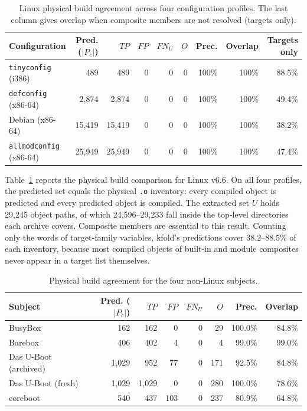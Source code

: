 \documentclass[acmsmall]{acmart}
\newcommand{\tool}{\textsf{kfold}\xspace}
\begin{document}
\begin{table}[t]
\centering\footnotesize
\caption{Linux physical build agreement across four configuration profiles.
The last column gives overlap when composite members are not resolved (targets only).}
\label{tab:linux-physical}
\begin{tabular}{lrrrrrrrr}
\toprule
Configuration & Pred. ($|P_c|$) & $TP$ & $FP$ & $FN_U$ & $O$ & Prec. & Overlap & Targets only \\
\midrule
\texttt{tinyconfig} (i386) & 489 & 489 & 0 & 0 & 0 & 100\% & 100\% & 88.5\% \\
\texttt{defconfig} (x86-64) & 2,874 & 2,874 & 0 & 0 & 0 & 100\% & 100\% & 49.4\% \\
Debian (x86-64) & 15,419 & 15,419 & 0 & 0 & 0 & 100\% & 100\% & 38.2\% \\
\texttt{allmodconfig} (x86-64) & 25,949 & 25,949 & 0 & 0 & 0 & 100\% & 100\% & 47.4\% \\
\bottomrule
\end{tabular}
\end{table}

Table~\ref{tab:linux-physical} reports the physical build comparison for Linux v6.6.
On all four profiles, the predicted set equals the physical \texttt{.o} inventory: every compiled object is predicted and every predicted object is compiled.
The extracted set $U$ holds 29,245 object paths, of which 24,596--29,233 fall inside the top-level directories each archive covers.
Composite members are essential to this result.
Counting only the words of target-family variables, \tool's predictions cover 38.2--88.5\% of each inventory, because most compiled objects of built-in and module composites never appear in a target list themselves.

\begin{table}[t]
\centering\footnotesize
\caption{Physical build agreement for the four non-Linux subjects.}
\label{tab:firmware-physical}
\begin{tabular}{lrrrrrrr}
\toprule
Subject & Pred. ($|P_c|$) & $TP$ & $FP$ & $FN_U$ & $O$ & Prec. & Overlap \\
\midrule
BusyBox & 162 & 162 & 0 & 0 & 29 & 100.0\% & 84.8\% \\
Barebox & 406 & 402 & 4 & 0 & 4 & 99.0\% & 99.0\% \\
Das U-Boot (archived) & 1,029 & 952 & 77 & 0 & 171 & 92.5\% & 84.8\% \\
Das U-Boot (fresh) & 1,029 & 1,029 & 0 & 0 & 280 & 100.0\% & 78.6\% \\
coreboot & 540 & 437 & 103 & 0 & 237 & 80.9\% & 64.8\% \\
\bottomrule
\end{tabular}
\end{table}
\end{document}

